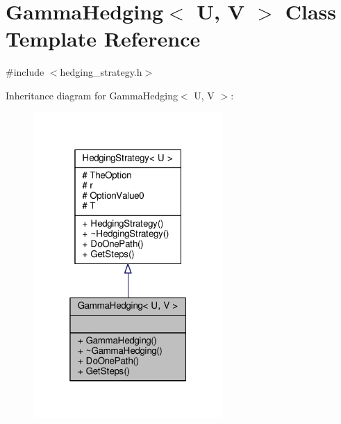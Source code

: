 \hypertarget{classGammaHedging}{}\section{Gamma\+Hedging$<$ U, V $>$ Class Template Reference}
\label{classGammaHedging}


{\ttfamily \#include $<$hedging\+\_\+strategy.\+h$>$}



Inheritance diagram for Gamma\+Hedging$<$ U, V $>$\+:
\nopagebreak
\begin{figure}[H]
\begin{center}
\leavevmode
\includegraphics[width=205pt]{classGammaHedging__inherit__graph}
\end{center}
\end{figure}


